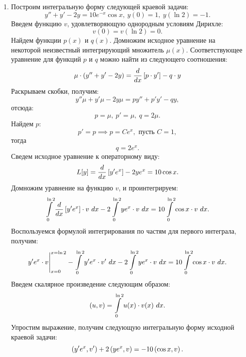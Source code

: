 		\begin{enumerate}

			\item Построим интегральную форму следующей краевой задачи:
				\[ y'' + y' - 2y = 10e^{-x} \cos{x}, ~ y(0) = 1, ~ y(\ln{2}) = -1. \]
				Введем функцию $v$, удовлетворяющую однородным условиям Дирихле:
				\[ v(0) = v(\ln{2}) = 0. \]
				Найдем функции $p(x)$ и $q(x)$. Домножим исходное уравнение на некоторой неизвестный интегрирующий множитель $\mu(x)$. Соответствующее уравнение для функций $p$ и $q$ можно найти из следующего соотношения:
				\[ \mu \cdot \left( y'' + y' - 2y \right) = \dfrac{d }{d x} \left[ p \cdot y' \right] - q \cdot y \]
				Раскрываем скобки, получим:
				\[ y'' \mu + y' \mu - 2y \mu = py'' + p'y' - qy, \]
				отсюда:
				\[ p = \mu, ~ p' = \mu, ~ q = 2 \mu. \]
				Найдем $p$:
				\[ p' = p \implies p = C e^{x}, \text{ пусть } C = 1, \]
				тогда
				\[ q = 2 e^{x}. \]
				Сведем исходное уравнение к операторному виду:
				\[ L[y] = \dfrac{d }{d x} \left[ y' e^x \right] - 2 y e^x = 10 \cos{x}. \]
				Домножим уравнение на функцию $v$, и проинтегрируем:
				\[ \int\limits_{0}^{\ln{2}} \dfrac{d }{d x} \left[ y' e^x \right] \cdot v ~ dx - 2 \int\limits_{0}^{\ln{2}} y e^{x} \cdot v ~ dx = 10 \int\limits_{0}^{\ln{2}} \cos{x} \cdot v ~ dx. \]
				Воспользуемся формулой интегрирования по частям для первого интеграла, получим:
				\[ y' e^{x} \cdot v \Biggl\vert \Biggr._{x = 0}^{x = \ln{2}} - \int\limits_{0}^{\ln{2}} y' e^{x} \cdot v' ~ dx - 2 \int\limits_{0}^{\ln{2}} y e^{x} \cdot v ~ dx = 10 \int\limits_{0}^{\ln{2}} \cos{x} \cdot v ~ dx. \]
				Введем скалярное произведение следующим образом:
				\[ \left( u, v \right) = \int\limits_{0}^{\ln{2}} u(x) \cdot v(x) ~ dx. \]
				Упростим выражение, получим следующую интегральную форму исходной краевой задачи:
				\[ \left( y' e^{x}, v' \right) + 2 \left( y e^{x}, v \right) = - 10 \left( \cos{x}, v \right). \]


\end{enumerate}
